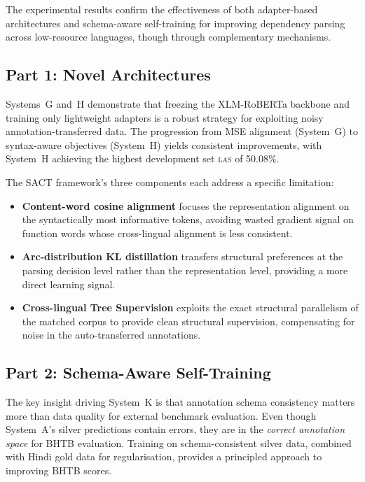 \documentclass[12pt,a4paper,oneside]{report}
\newcommand{\xlmr}{XLM-RoBERTa}
\newcommand{\las}{\textsc{las}}
\begin{document}
The experimental results confirm the effectiveness of both adapter-based
architectures and schema-aware self-training for improving dependency parsing across
low-resource languages, though through complementary mechanisms.

\subsection{Part 1: Novel Architectures}

Systems~G and~H demonstrate that freezing the \xlmr{} backbone and training only
lightweight adapters is a robust strategy for exploiting noisy annotation-transferred
data. The progression from MSE alignment (System~G) to syntax-aware objectives
(System~H) yields consistent improvements, with System~H achieving the highest
development set \las{} of 50.08\%.

The SACT framework's three components each address a specific limitation:
\begin{itemize}
  \item \textbf{Content-word cosine alignment} focuses the representation alignment
        on the syntactically most informative tokens, avoiding wasted gradient signal
        on function words whose cross-lingual alignment is less consistent.
  \item \textbf{Arc-distribution KL distillation} transfers structural preferences
        at the parsing decision level rather than the representation level, providing
        a more direct learning signal.
  \item \textbf{Cross-lingual Tree Supervision} exploits the exact structural
        parallelism of the matched corpus to provide clean structural supervision,
        compensating for noise in the auto-transferred annotations.
\end{itemize}

\subsection{Part 2: Schema-Aware Self-Training}

The key insight driving System~K is that annotation schema consistency matters more
than data quality for external benchmark evaluation. Even though System~A's silver
predictions contain errors, they are in the \emph{correct annotation space} for BHTB
evaluation. Training on schema-consistent silver data, combined with Hindi gold
data for regularisation, provides a principled approach to improving BHTB scores.
\end{document}
